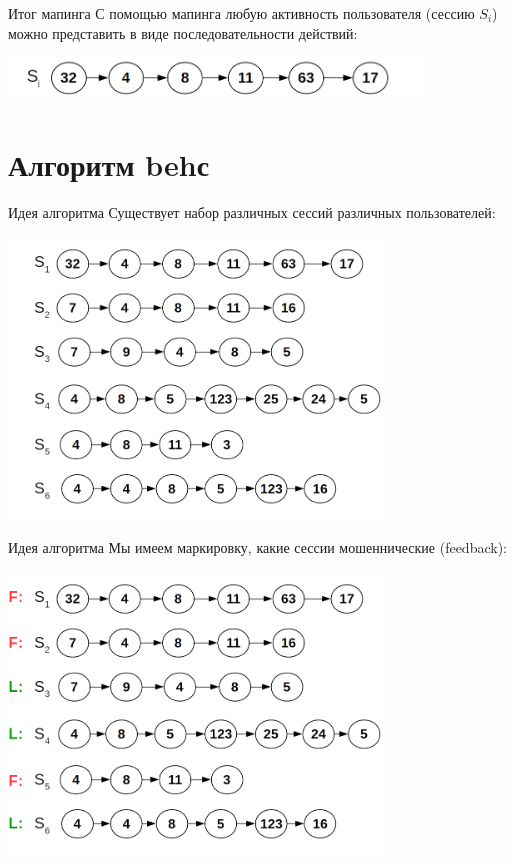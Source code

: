 \begin{frame}{Итог мапинга}
	С помощью мапинга любую  активность пользователя (сессию $S_i$)
	можно представить в виде последовательности
	действий:
	
	\begin{center}
		\includegraphics[width=11cm]{../pic/beh/chain.png}\centering
	\end{center}
\end{frame}

\section{Алгоритм behс}\label{section:behс}

\begin{frame}{Идея алгоритма}
	\small
	Существует набор различных сессий различных пользователей:
	\begin{center}
		\includegraphics[width=10cm]{../pic/beh/idea_1.png}\centering
	\end{center}
\end{frame}

\begin{frame}{Идея алгоритма}
	\small
	Мы имеем маркировку, какие сессии мошеннические (feedback):
	\begin{center}
		\includegraphics[width=10cm]{../pic/beh/idea_2.png}\centering
	\end{center}
\end{frame}

